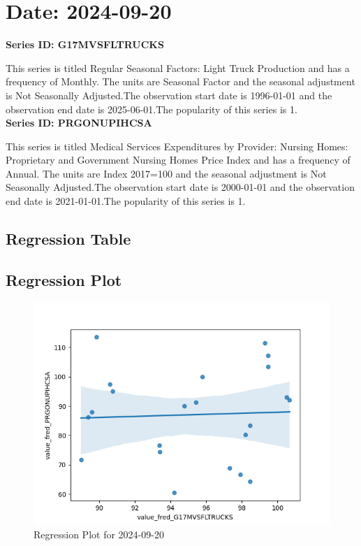 \section{Date: 2024-09-20}
\noindent \textbf{Series ID: G17MVSFLTRUCKS} 

\noindent This series is titled Regular Seasonal Factors: Light Truck Production and has a frequency of Monthly. The units are Seasonal Factor and the seasonal adjustment is Not Seasonally Adjusted.The observation start date is 1996-01-01 and the observation end date is 2025-06-01.The popularity of this series is 1. \\ 

\noindent \textbf{Series ID: PRGONUPIHCSA} 

\noindent This series is titled Medical Services Expenditures by Provider: Nursing Homes: Proprietary and Government Nursing Homes Price Index and has a frequency of Annual. The units are Index 2017=100 and the seasonal adjustment is Not Seasonally Adjusted.The observation start date is 2000-01-01 and the observation end date is 2021-01-01.The popularity of this series is 1. \\ 

\subsection{Regression Table}


\subsection{Regression Plot}
\begin{figure}
\centering
\includegraphics[scale = 0.9]{plots/plot_2024-09-20.png}
\caption{Regression Plot for 2024-09-20}
\end{figure}
\newpage

